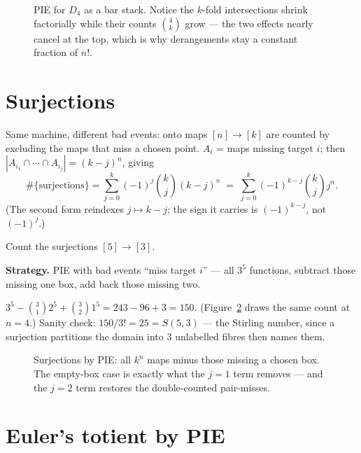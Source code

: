 \begin{figure}[ht]\centering

\caption{PIE for $D_4$ as a bar stack. Notice the $k$-fold intersections
shrink factorially while their counts $\binom{4}{k}$ grow --- the two
effects nearly cancel at the top, which is why derangements stay a
constant fraction of $n!$.}
\label{fig:piebar}
\end{figure}

\section{Surjections}\label{sec:surj}
Same machine, different bad events: onto maps $[n] \to [k]$ are counted
by excluding the maps that miss a chosen point. $A_i$ = maps missing
target $i$; then $|A_{i_1}\cap\cdots\cap A_{i_j}| = (k-j)^n$, giving
\[
\#\{\text{surjections}\} = \sum_{j=0}^{k} (-1)^j \binom{k}{j} (k-j)^n
\;=\; \sum_{j=0}^{k} (-1)^{k-j} \binom{k}{j} j^n .
\]
(The second form reindexes $j \mapsto k-j$; the sign it carries is
$(-1)^{k-j}$, not $(-1)^j$.)

\begin{example}\label{ex:surj53}
Count the surjections $[5] \to [3]$.
\par\smallskip
\textbf{Strategy.} PIE with bad events ``miss target $i$'' --- all $3^5$
functions, subtract those missing one box, add back those missing two.
\par\smallskip
\begin{solution}
$3^5 - \binom{3}{1}2^5 + \binom{3}{2}1^5 = 243 - 96 + 3 = 150$.
(Figure~\ref{fig:surj} draws the same count at $n = 4$.) Sanity check:
$150/3! = 25 = S(5,3)$ --- the Stirling number, since a surjection
partitions the domain into $3$ unlabelled fibres then names them.
\end{solution}
\end{example}

\begin{figure}[ht]\centering

\caption{Surjections by PIE: all $k^n$ maps minus those missing a chosen
box. The empty-box case is exactly what the $j=1$ term removes --- and the
$j=2$ term restores the double-counted pair-misses.}
\label{fig:surj}
\end{figure}

\section{Euler's totient by PIE}\label{sec:phipie}

